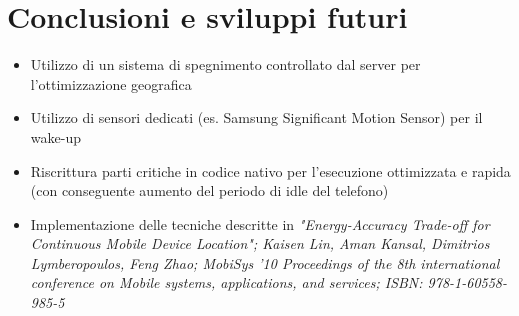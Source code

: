 \documentclass[a4paper,10pt]{memoir}
\begin{document}
%
%
%

\chapter{Conclusioni e sviluppi futuri}

\begin{itemize}
\item Utilizzo di un sistema di spegnimento controllato dal server per l'ottimizzazione geografica
\item Utilizzo di sensori dedicati (es. Samsung Significant Motion Sensor) per il wake-up
\item Riscrittura parti critiche in codice nativo per l'esecuzione ottimizzata e rapida (con conseguente aumento del periodo di idle del telefono)
\item Implementazione delle tecniche descritte in \textit{"Energy-Accuracy Trade-off for Continuous Mobile Device Location"; Kaisen Lin, Aman Kansal, Dimitrios Lymberopoulos, Feng Zhao; MobiSys '10 Proceedings of the 8th international conference on Mobile systems, applications, and services; ISBN: 978-1-60558-985-5}
\end{itemize}
\end{document}
